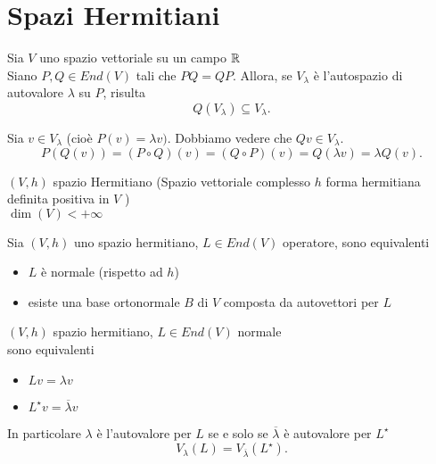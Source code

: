 \documentclass[12px]{article}
\begin{document}
\section{Spazi Hermitiani}
	\begin{lemm}
		Sia $V$ uno spazio vettoriale su un campo $\mathbb{R}$\\
		Siano  $P,Q\in End(V)$ tali che $PQ=QP$. Allora, se  $V_\lambda$ è l'autospazio di autovalore $\lambda$ su $P$, risulta
		\[
		Q(V_\lambda)\subseteq V_\lambda
		.\] 
	\end{lemm}
	\begin{dimo}
		Sia $v\in V_ \lambda $ (cioè $P(v) = \lambda v)$. Dobbiamo vedere che $Qv\in V_ \lambda$.
		\[
		P(Q(v)) = (P\circ Q)(v) = (Q\circ P)(v) = Q( \lambda v) = \lambda Q(v)
		.\]
	\end{dimo}
	$(V,h)$ spazio Hermitiano (Spazio vettoriale complesso $h$ forma hermitiana definita positiva in $V$ )\\
	$\dim(V) < +\infty$
	 \begin{teo}
		Sia $(V,h)$ uno spazio hermitiano, $L\in End(V)$ operatore, sono equivalenti
		\begin{itemize}
			\item $L$ è normale (rispetto ad $h$)
			\item esiste una base ortonormale $B$ di  $V$ composta da autovettori per $L$
		\end{itemize}
	\end{teo}
	\begin{lemm}
		$(V,h)$ spazio hermitiano, $L\in End(V)$ normale\\
		sono equivalenti
		\begin{itemize}
			\item $Lv = \lambda v$
			\item  $L^\star v = \overline{ \lambda} v$
		\end{itemize}
		In particolare $ \lambda$ è l'autovalore per $L$ se e solo se $\overline{ \lambda}$ è autovalore per $ L^\star$ 
		\[
			V_ \lambda (L) = V_{\overline{ \lambda}}(L^\star)
		.\] 
	\end{lemm}
\end{document}
